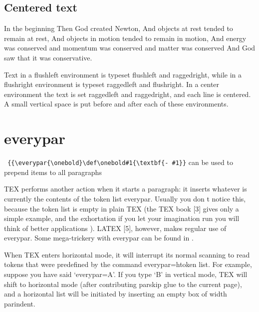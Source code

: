 {\small \begin{flushleft} \lorem \end{flushleft}}

{\small \begin{flushright} \lorem \end{flushright}}

\bottomline
\subsection{Centered text}
{\small
\begin{center}
In the beginning
Then God created Newton,
And objects at rest tended to remain at rest,
And objects in motion tended to remain in motion,
And energy was conserved and momentum was conserved and
matter was conserved
And God saw that it was conservative.
\end{center}
}



Text in a flushleft environment is typeset flushleft and raggedright, while in a
flushright environment is typeset raggedleft and flushright. In a center environment
the text is set raggedleft and raggedright, and each line is centered. A small vertical space
is put before and after each of these environments.


\section{everypar}
\verb+ {{\everypar{\onebold}\def\onebold#1{\textbf{- #1}}+ can be used to prepend items to
all paragraphs

TEX performs another action when it starts a paragraph:
it inserts whatever is currently the contents of the token
list everypar. Usually you don t notice this, because
the token list is empty in plain TEX (the TEX book [3]
gives only a simple example, and the exhortation  if you
let your imagination run you will think of better applications ).
LATEX [5], however, makes regular use of
everypar. Some mega-trickery with everypar
can be found in \cite{Lamport1994}. 

When TEX enters horizontal mode, it will interrupt its normal scanning to read
tokens that were predefined by the command everypar={htoken list}. For
example, suppose you have said `everypar={A}'. If you type `B' in vertical mode, TEX
will shift to horizontal mode (after contributing parskip glue to the current page),
and a horizontal list will be initiated by inserting an empty box of width parindent.

